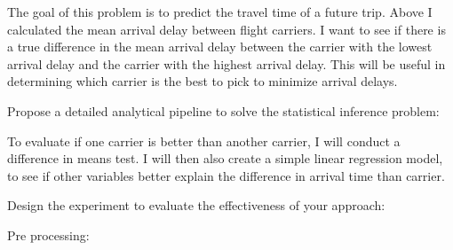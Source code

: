 \documentclass[
]{article}
\begin{document}
The goal of this problem is to predict the travel time of a future trip.
Above I calculated the mean arrival delay between flight carriers. I
want to see if there is a true difference in the mean arrival delay
between the carrier with the lowest arrival delay and the carrier with
the highest arrival delay. This will be useful in determining which
carrier is the best to pick to minimize arrival delays.

Propose a detailed analytical pipeline to solve the statistical
inference problem:

To evaluate if one carrier is better than another carrier, I will
conduct a difference in means test. I will then also create a simple
linear regression model, to see if other variables better explain the
difference in arrival time than carrier.

Design the experiment to evaluate the effectiveness of your approach:

Pre processing:
\end{document}

